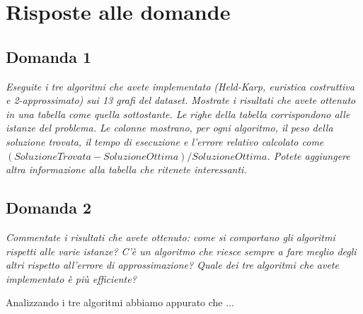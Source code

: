 \section{Risposte alle domande}

\subsection{Domanda 1}

\textit{Eseguite i tre algoritmi che avete implementato (Held-Karp, euristica costruttiva e 2-approssimato) sui 13 grafi
del dataset. Mostrate i risultati che avete ottenuto in una tabella come quella sottostante. Le righe della tabella
corrispondono alle istanze del problema. Le colonne mostrano, per ogni algoritmo, il peso della soluzione trovata, il
tempo di esecuzione e l'errore relativo calcolato come $(SoluzioneTrovata - SoluzioneOttima) / SoluzioneOttima$. Potete
aggiungere altra informazione alla tabella che ritenete interessanti.}




\subsection{Domanda 2}
\textit{Commentate i risultati che avete ottenuto: come si comportano gli algoritmi rispetti alle varie istanze?
C'è un algoritmo che riesce sempre a fare meglio degli altri rispetto all'errore di approssimazione? Quale dei tre
algoritmi che avete implementato è più efficiente?}


Analizzando i tre algoritmi abbiamo appurato che ...